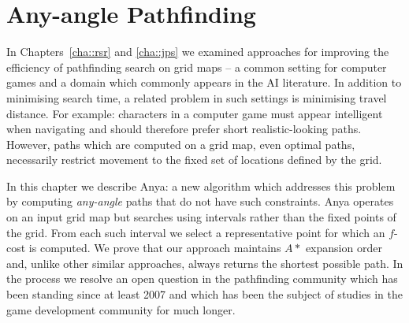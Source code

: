 \chapter{Any-angle Pathfinding}
\label{cha::anya}
In Chapters~\ref{cha::rsr} and \ref{cha::jps} we examined approaches for
improving the efficiency of pathfinding search on grid maps -- a common
setting for computer games and a domain which commonly appears in the AI
literature. 
In addition to minimising search time, a related problem in such settings
is minimising travel distance. For example: characters in a computer game 
must appear intelligent when navigating and should therefore prefer short
realistic-looking paths. However, paths which are computed on a grid map, 
even optimal paths, necessarily restrict movement to the fixed set of 
locations defined by the grid. 
\par
In this chapter we describe Anya: a new algorithm which addresses this
problem by computing \emph{any-angle} paths that do not have such constraints.
Anya operates on an input grid map but searches using intervals rather than 
the fixed points of the grid. 
From each such interval we select a representative point for which an
$f$-cost is computed. 
We prove that our approach maintains $A*$ expansion order and, unlike other
similar approaches, always returns the shortest possible path.
In the process we resolve an open question in the pathfinding community which
has been standing since at least 2007 and which has been the subject of
studies in the game development community for much longer.


